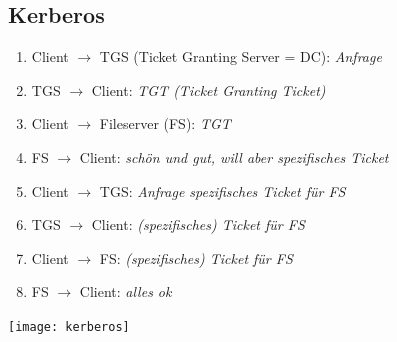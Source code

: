 \subsection{Kerberos}
\begin{minipage}{0.45\linewidth}
    \begin{enumerate}
        \item Client $\rightarrow$ TGS (Ticket Granting Server = DC): \textit{Anfrage}
        \item TGS $\rightarrow$ Client: \textit{TGT (Ticket Granting Ticket)}
        \item Client $\rightarrow$ Fileserver (FS): \textit{TGT}
        \item FS $\rightarrow$ Client: \textit{schön und gut, will aber spezifisches Ticket}
        \item Client $\rightarrow$ TGS: \textit{Anfrage spezifisches Ticket für FS}
        \item TGS $\rightarrow$ Client: \textit{(spezifisches) Ticket für FS}
        \item Client $\rightarrow$ FS: \textit{(spezifisches) Ticket für FS}
        \item FS $\rightarrow$ Client: \textit{alles ok}
    \end{enumerate}
\end{minipage}
\begin{minipage}{0.5\linewidth}
    \begin{center}
        \texttt{[image: kerberos]}
        \vspace{-8pt}
    \end{center}
\end{minipage}


